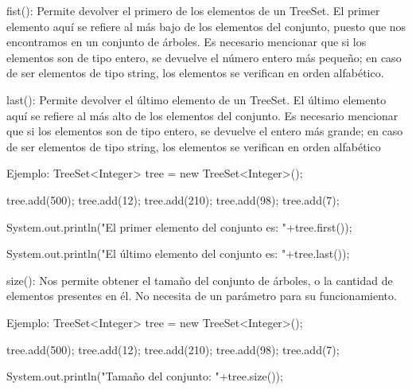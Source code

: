 \documentclass[12pt, letterpaper]{article} %
\begin{document}
fist():
Permite devolver el primero de los elementos de un TreeSet. El primer elemento aquí se refiere al más bajo de los elementos del conjunto, puesto que nos encontramos en un conjunto de árboles. Es necesario mencionar que si los elementos son de tipo entero, se devuelve el número entero más pequeño; en caso de ser elementos de tipo string, los elementos se verifican en orden alfabético.

last():
Permite devolver el último elemento de un TreeSet. El último elemento aquí se refiere al más alto de los elementos del conjunto. Es necesario mencionar que si los elementos son de tipo entero, se devuelve el entero más grande; en caso de ser elementos de tipo string, los elementos se verifican en orden alfabético

Ejemplo:
TreeSet<Integer> tree = new TreeSet<Integer>();

tree.add(500);
tree.add(12);
tree.add(210);
tree.add(98);
tree.add(7);

System.out.println("El primer elemento del conjunto es: "+tree.first());

System.out.println("El último elemento del conjunto es: "+tree.last());


size():
Nos permite obtener el tamaño del conjunto de árboles, o la cantidad de elementos presentes en él. No necesita de un parámetro para su funcionamiento.

Ejemplo:
TreeSet<Integer> tree = new TreeSet<Integer>();

tree.add(500);
tree.add(12);
tree.add(210);
tree.add(98);
tree.add(7);

System.out.println("Tamaño del conjunto: "+tree.size());
\end{document}

